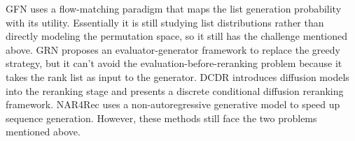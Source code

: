 GFN \cite{gfn} uses a flow-matching paradigm that maps the list generation probability with its utility. Essentially it is still studying list distributions rather than directly modeling the permutation space, so it still has the challenge mentioned above. GRN \cite{grn} proposes an evaluator-generator framework to replace the greedy strategy, but it can't avoid the evaluation-before-reranking problem \cite{xi2021context} because it takes the rank list as input to the generator. DCDR \cite{dcdr} introduces diffusion models into the reranking stage and presents a discrete conditional diffusion reranking framework. NAR4Rec \cite{nar4rec} uses a non-autoregressive generative model to speed up sequence generation. However, these methods still face the two problems mentioned above.